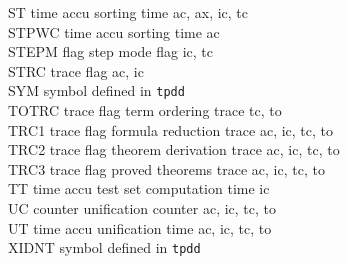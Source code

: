 \begin{tabbing}
ST    \> time accu \> sorting time \> ac, ax, ic, tc \\
STPWC \> time accu \> sorting time \> ac \\
STEPM \> flag     \> step mode flag \> ic, tc \\
STRC  \> trace flag \> \> ac, ic \\
SYM   \> symbol defined in {\tt tpdd} \\
TOTRC \> trace flag \> term ordering trace \> tc, to \\
TRC1  \> trace flag \> formula reduction trace \> ac, ic, tc, to \\
TRC2  \> trace flag \> theorem derivation trace \> ac, ic, tc, to \\
TRC3  \> trace flag \> proved theorems trace \> ac, ic, tc, to \\
TT    \> time accu \> test set computation time \> ic \\
UC    \> counter \> unification counter \> ac, ic, tc, to \\
UT    \> time accu \> unification time \> ac, ic, tc, to \\
XIDNT \> symbol defined in {\tt tpdd} \\
\end{tabbing}
